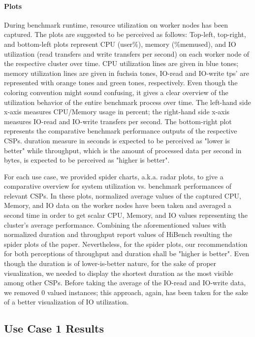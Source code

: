 \documentclass[review]{elsarticle}
\begin{document}
\paragraph{Plots}During benchmark runtime, resource utilization on worker nodes has been captured. The plots are suggested to be perceived as follows: Top-left, top-right, and bottom-left plots represent CPU (user\%), memory (\%memused), and IO utilization (read transfers and write transfers per second) on each worker node of the respective cluster over time. CPU utilization lines are given in blue tones; memory utilization lines are given in fuchsia tones, IO-read and IO-write tps' are represented with orange tones and green tones, respectively. Even though the coloring convention might sound confusing, it gives a clear overview of the utilization behavior of the entire benchmark process over time. The left-hand side x-axis measures CPU/Memory usage in percent; the right-hand side x-axis measures IO-read and IO-write transfers per second. The bottom-right plot represents the comparative benchmark performance outputs of the respective CSPs. duration measure in seconds is expected to be perceived as "lower is better" while throughput, which is the amount of processed data per second in bytes, is expected to be perceived as "higher is better".

For each use case, we provided spider charts, a.k.a. radar plots, to give a comparative overview for system utilization vs. benchmark performances of relevant CSPs. In these plots, normalized average values of the captured CPU, Memory, and IO data on the worker nodes have been taken and averaged a second time in order to get scalar CPU, Memory, and IO values representing the cluster's average performance. Combining the aforementioned values with normalized duration and throughput report values of HiBench resulting the spider plots of the paper. Nevertheless, for the spider plots, our recommendation for both perceptions of throughput and duration shall be "higher is better". Even though the duration is of lower-is-better nature, for the sake of proper visualization, we needed to display the shortest duration as the most visible among other CSPs. Before taking the average of the IO-read and IO-write data, we removed 0 valued instances; this approach, again, has been taken for the sake of a better visualization of IO utilization.


\subsection{Use Case 1 Results}
\end{document}
